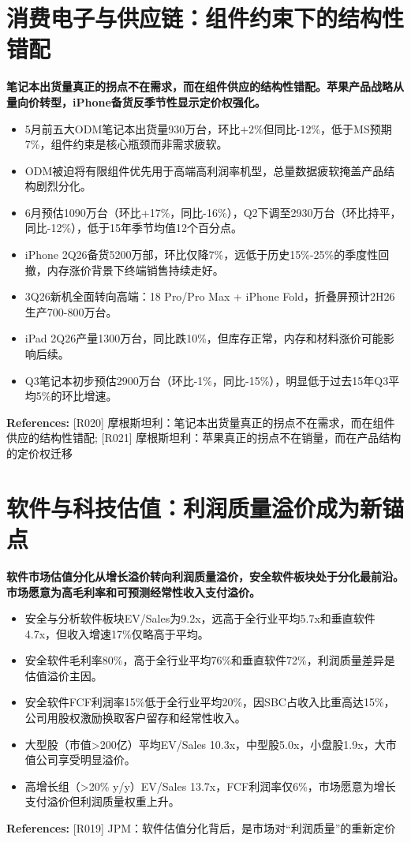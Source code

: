 \documentclass[11pt]{ctexart}
\begin{document}
\section{消费电子与供应链：组件约束下的结构性错配}
\textbf{笔记本出货量真正的拐点不在需求，而在组件供应的结构性错配。苹果产品战略从量向价转型，iPhone备货反季节性显示定价权强化。}

\begin{itemize}
  \item 5月前五大ODM笔记本出货量930万台，环比+2\%但同比-12\%，低于MS预期7\%，组件约束是核心瓶颈而非需求疲软。
  \item ODM被迫将有限组件优先用于高端高利润率机型，总量数据疲软掩盖产品结构剧烈分化。
  \item 6月预估1090万台（环比+17\%，同比-16\%），Q2下调至2930万台（环比持平，同比-12\%），低于15年季节均值12个百分点。
  \item iPhone 2Q26备货5200万部，环比仅降7\%，远低于历史15\%-25\%的季度性回撤，内存涨价背景下终端销售持续走好。
  \item 3Q26新机全面转向高端：18 Pro/Pro Max + iPhone Fold，折叠屏预计2H26生产700-800万台。
  \item iPad 2Q26产量1300万台，同比跌10\%，但库存正常，内存和材料涨价可能影响后续。
  \item Q3笔记本初步预估2900万台（环比-1\%，同比-15\%），明显低于过去15年Q3平均5\%的环比增速。
\end{itemize}
{\small\color{refgray}\textbf{References:} [R020] 摩根斯坦利：笔记本出货量真正的拐点不在需求，而在组件供应的结构性错配; [R021] 摩根斯坦利：苹果真正的拐点不在销量，而在产品结构的定价权迁移}

\section{软件与科技估值：利润质量溢价成为新锚点}
\textbf{软件市场估值分化从增长溢价转向利润质量溢价，安全软件板块处于分化最前沿。市场愿意为高毛利率和可预测经常性收入支付溢价。}

\begin{itemize}
  \item 安全与分析软件板块EV/Sales为9.2x，远高于全行业平均5.7x和垂直软件4.7x，但收入增速17\%仅略高于平均。
  \item 安全软件毛利率80\%，高于全行业平均76\%和垂直软件72\%，利润质量差异是估值溢价主因。
  \item 安全软件FCF利润率15\%低于全行业平均20\%，因SBC占收入比重高达15\%，公司用股权激励换取客户留存和经常性收入。
  \item 大型股（市值>200亿）平均EV/Sales 10.3x，中型股5.0x，小盘股1.9x，大市值公司享受明显溢价。
  \item 高增长组（>20\% y/y）EV/Sales 13.7x，FCF利润率仅6\%，市场愿意为增长支付溢价但利润质量权重上升。
\end{itemize}
{\small\color{refgray}\textbf{References:} [R019] JPM：软件估值分化背后，是市场对“利润质量”的重新定价}
\end{document}

